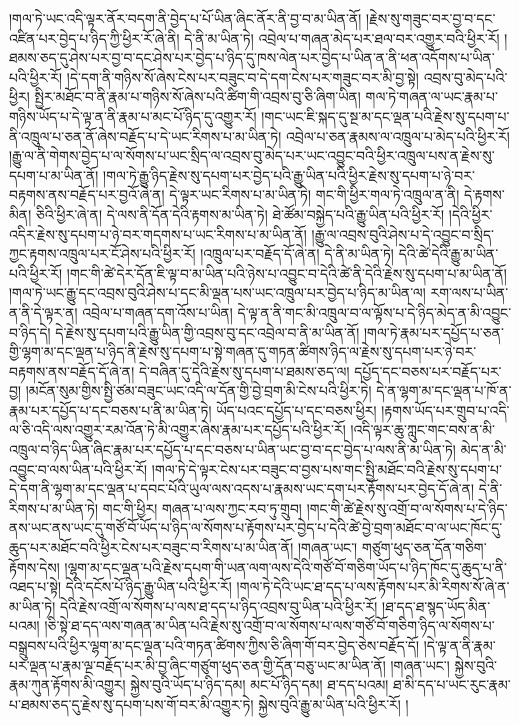 །གལ་ཏེ་ཡང་འདི་ལྟར་ནོར་བདག་ནི་བྱེད་པ་པོ་ཡིན་ཞིང་ནོར་ནི་བྱ་བ་མ་ཡིན་ནོ། །རྗེས་སུ་གཟུང་བར་བྱ་བ་དང་འཛིན་པར་བྱེད་པ་ཉིད་ཀྱི་ཕྱིར་རོ་ཞེ་ནི། དེ་ནི་མ་ཡིན་ཏེ། འབྲེལ་པ་གཞན་མེད་པར་ཐལ་བར་འགྱུར་བའི་ཕྱིར་རོ། །ཐམས་ཅད་དུ་ཤེས་པར་བྱ་བ་དང་ཤེས་པར་བྱེད་པ་ཉིད་དུ་ཁས་ལེན་པར་བྱེད་པ་ཡིན་ན་ནི་ཕན་འདོགས་པ་ཡིན་པའི་ཕྱིར་རོ། །དེ་དག་ནི་གཉིས་སོ་ཞེས་ངེས་པར་བཟུང་བ་དེ་དག་ངེས་པར་གཟུང་བར་མི་བྱ་སྟེ། འབྲས་བུ་མེད་པའི་ཕྱིར། སྤྱིར་མཐོང་བ་ནི་རྣམ་པ་གཉིས་སོ་ཞེས་པའི་ཚིག་གི་འབྲས་བུ་ཅི་ཞིག་ཡིན། གལ་ཏེ་གཞན་ལ་ཡང་རྣམ་པ་གཉིས་ཡོད་པ་དེ་ལྟ་ན་ནི་རྣམ་པ་མང་པོ་ཉིད་དུ་འགྱུར་རོ། །གང་ཡང་ཇི་སྐད་དུ་སྔ་མ་དང་ལྡན་པའི་རྗེས་སུ་དཔག་པ་ནི་འཁྲུལ་པ་ཅན་ནོ་ཞེས་བརྗོད་པ་དེ་ཡང་རིགས་པ་མ་ཡིན་ཏེ། འབྲེལ་པ་ཅན་རྣམས་ལ་འཁྲུལ་པ་མེད་པའི་ཕྱིར་རོ། །རྒྱུ་ལ་ནི་གེགས་བྱེད་པ་ལ་སོགས་པ་ཡང་སྲིད་ལ་འབྲས་བུ་མེད་པར་ཡང་འབྱུང་བའི་ཕྱིར་འཁྲུལ་པས་ན་རྗེས་སུ་དཔག་པ་མ་ཡིན་ནོ། །གལ་ཏེ་རྒྱུ་ཉིད་རྗེས་སུ་དཔག་པར་བྱེད་པའི་རྒྱུ་ཡིན་པའི་ཕྱིར་རྗེས་སུ་དཔག་པ་ཉེ་བར་བརྟགས་ནས་བརྗོད་པར་བྱའོ་ཞེ་ན། དེ་ལྟར་ཡང་རིགས་པ་མ་ཡིན་ཏེ། གང་གི་ཕྱིར་གལ་ཏེ་འཁྲུལ་ན་ནི། དེ་རྟགས་མིན། ཅིའི་ཕྱིར་ཞེ་ན། དེ་ལས་ནི་དོན་དེའི་རྟགས་མ་ཡིན་ཏེ། ཐེ་ཚོམ་བསྐྱེད་པའི་རྒྱུ་ཡིན་པའི་ཕྱིར་རོ། །དེའི་ཕྱིར་འདིར་རྗེས་སུ་དཔག་པ་ཉེ་བར་གདགས་པ་ཡང་རིགས་པ་མ་ཡིན་ནོ། །རྒྱུ་ལ་འབྲས་བུའི་ཤེས་པ་དེ་འབྱུང་བ་སྲིད་ཀྱང་རྟགས་འཁྲུལ་པར་ངོ་ཤེས་པའི་ཕྱིར་རོ། །འཁྲུལ་པར་བརྗོད་དོ་ཞེ་ན། དེ་ནི་མ་ཡིན་ཏེ། དེའི་ཚེ་དེའི་རྒྱུ་མ་ཡིན་པའི་ཕྱིར་རོ། །གང་གི་ཚེ་དེར་དོན་ཇི་ལྟ་བ་མ་ཡིན་པའི་ཉེས་པ་འབྱུང་བ་དེའི་ཚེ་ནི་དེའི་རྗེས་སུ་དཔག་པ་མ་ཡིན་ནོ། །གལ་ཏེ་ཡང་རྒྱུ་དང་འབྲས་བུའི་ཤེས་པ་དང་མི་ལྡན་པས་ཡང་འཁྲུལ་པར་བྱེད་པ་ཉིད་མ་ཡིན་ལ། རག་ལས་པ་ཡིན་ན་ནི་དེ་ལྟར་ན། འབྲེལ་པ་གཞན་དག་འོས་པ་ཡིན། དེ་ལྟ་ན་ནི་གང་མི་འཁྲུལ་བ་ལ་ལྟོས་པ་དེ་ཉིད་མེད་ན་མི་འབྱུང་བ་ཉིད་དེ། དེ་རྗེས་སུ་དཔག་པའི་རྒྱུ་ཡིན་གྱི་འབྲས་བུ་དང་འབྲེལ་བ་ནི་མ་ཡིན་ནོ། །གལ་ཏེ་རྣམ་པར་དཔྱོད་པ་ཅན་གྱི་ལྷག་མ་དང་ལྡན་པ་ཉིད་ནི་རྗེས་སུ་དཔག་པ་སྟེ་གཞན་དུ་གཏན་ཚིགས་ཉིད་ལ་རྗེས་སུ་དཔག་པར་ཉེ་བར་བརྟགས་ནས་བརྗོད་དོ་ཞེ་ན། དེ་བཞིན་དུ་དེའི་རྗེས་སུ་དཔག་པ་ཐམས་ཅད་ལ། དཔྱོད་དང་བཅས་པར་བརྗོད་པར་བྱ། །མངོན་སུམ་གྱིས་སྤྱི་ཙམ་བཟུང་ཡང་འདི་ལ་དོན་གྱི་བྱེ་བྲག་མི་ངེས་པའི་ཕྱིར་ཏེ། དེ་ན་ལྷག་མ་དང་ལྡན་པ་ཁོ་ན་རྣམ་པར་དཔྱོད་པ་དང་བཅས་པ་ནི་མ་ཡིན་ཏེ། ཡོད་པའང་དཔྱོད་པ་དང་བཅས་ཕྱིར། །རྟགས་ཡོད་པར་གྲུབ་པ་འདི་ལ་ཅི་འདི་ལས་འགྱུར་རམ་འོན་ཏེ་མི་འགྱུར་ཞེས་རྣམ་པར་དཔྱོད་པའི་ཕྱིར་རོ། །འདི་ལྟར་ཆུ་ཀླུང་གང་བས་ན་མི་འཁྲུལ་བ་ཉིད་ཡིན་ཞིང་རྣམ་པར་དཔྱོད་པ་དང་བཅས་པ་ཡིན་ཡང་བྱ་བ་དང་བྱེད་པ་ལས་ནི་མ་ཡིན་ཏེ། མེད་ན་མི་འབྱུང་བ་ལས་ཡིན་པའི་ཕྱིར་རོ། །གལ་ཏེ་དེ་ལྟར་ངེས་པར་བཟུང་བ་བྱས་པས་གང་སྤྱི་མཐོང་བའི་རྗེས་སུ་དཔག་པ་དེ་དག་ནི་ལྷག་མ་དང་ལྡན་པ་དབང་པོའི་ཡུལ་ལས་འདས་པ་རྣམས་ཡང་དག་པར་རྟོགས་པར་བྱེད་དོ་ཞེ་ན། དེ་ནི་རིགས་པ་མ་ཡིན་ཏེ། གང་གི་ཕྱིར། གཞན་པ་ལས་ཀྱང་རབ་ཏུ་གྲུབ། །གང་གི་ཚེ་རྗེས་སུ་འགྲོ་བ་ལ་སོགས་པ་དེ་ཉིད་ནས་ཡང་ནས་ཡང་དུ་གཙོ་བོ་ཡོད་པ་ཉིད་ལ་སོགས་པ་རྟོགས་པར་བྱེད་པ་དེའི་ཚེ་བྱེ་བྲག་མཐོང་བ་ལ་ཡང་ཁོང་དུ་ཆུད་པར་མཐོང་བའི་ཕྱིར་ངེས་པར་བཟུང་བ་རིགས་པ་མ་ཡིན་ནོ། །གཞན་ཡང་། གཙུག་ཕུད་ཅན་དོན་གཅིག་རྟོགས་དེས། །ལྷག་མ་དང་ལྡན་པའི་རྗེས་དཔག་གི་ཡན་ལག་ལས་དེའི་གཙོ་བོ་གཅིག་ཡོད་པ་ཉིད་ཁོང་དུ་ཆུད་པ་ནི་འཐད་པ་སྟེ། དེའི་དངོས་པོ་ཉིད་རྒྱུ་ཡིན་པའི་ཕྱིར་རོ། །གལ་ཏེ་དེའི་ཡང་ཐ་དད་པ་ལས་རྟོགས་པར་མི་རིགས་སོ་ཞེ་ན་མ་ཡིན་ཏེ། དེའི་རྗེས་འགྲོ་ལ་སོགས་པ་ལས་ཐ་དད་པ་ཉིད་འབྲས་བུ་ཡིན་པའི་ཕྱིར་རོ། །ཐ་དད་ཐ་སྙད་ཡོད་མིན་པའམ། །ཅི་སྟེ་ཐ་དད་ལས་གཞན་མ་ཡིན་པའི་རྗེས་སུ་འགྲོ་བ་ལ་སོགས་པ་ལས་གཙོ་བོ་གཅིག་ཉིད་ལ་སོགས་པ་བསྒྲུབས་པའི་ཕྱིར་ལྷག་མ་དང་ལྡན་པའི་གཏན་ཚིགས་ཀྱིས་ཅི་ཞིག་གོ་བར་བྱེད་ཅེས་བརྗོད་དོ། །དེ་ལྟ་ན་ནི་རྣམ་པར་ལྡན་པ་རྣམ་ལྔ་བརྗོད་པར་མི་བྱ་ཞིང་གཙུག་ཕུད་ཅན་གྱི་དོན་བཅུ་ཡང་མ་ཡིན་ནོ། །གཞན་ཡང་། སྐྱེས་བུའི་རྣམ་ཀུན་རྟོགས་མི་འགྱུར། སྐྱེས་བུའི་ཡོད་པ་ཉིད་དམ། མང་པོ་ཉིད་དམ། ཐ་དད་པའམ། ཐ་མི་དད་པ་ཡང་རུང་རྣམ་པ་ཐམས་ཅད་དུ་རྗེས་སུ་དཔག་པས་གོ་བར་མི་འགྱུར་ཏེ། སྐྱེས་བུའི་རྒྱུ་མ་ཡིན་པའི་ཕྱིར་རོ། །
